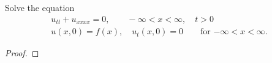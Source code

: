 \begin{problem}{2.12}
  Solve the equation
  \begin{align*}
    u_{tt} + u_{xxxx} = 0, \qquad -\infty < x < \infty, \quad t > 0 \\
    u(x, 0) = f(x),\quad u_t(x, 0) = 0 \qquad \text{for $-\infty < x < \infty$}.
  \end{align*}
\end{problem}

\begin{proof}
\end{proof}
\newpage
